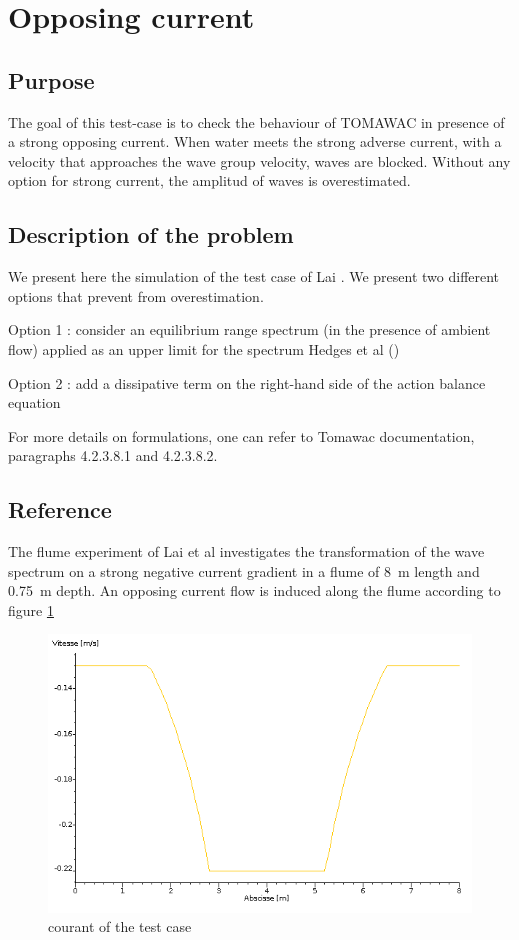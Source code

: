 \section{Opposing current}
%

%
\subsection{Purpose}
%
The goal of this test-case is to check the behaviour of TOMAWAC in presence of a strong opposing current. When water meets the strong adverse current, with a velocity that approaches the wave group velocity, waves are blocked. Without any option for strong current, the amplitud of waves is overestimated.

%
\subsection{Description of the problem}
%
We present here the simulation of the test case of Lai \cite{Lai1989}. We present two different options that prevent from overestimation.

Option 1 : consider an equilibrium range spectrum (in the presence of ambient flow) applied as an upper limit for the spectrum Hedges et al  (\cite{Hedges1985})

Option 2 : add a dissipative term on the right-hand side of the action balance equation \cite{Westhuys2012}

For more details on formulations, one can refer to Tomawac documentation, paragraphs 4.2.3.8.1 and 4.2.3.8.2.

%
\subsection{Reference}
%
The flume experiment of Lai et al \cite{Lai1989} investigates the transformation of the wave spectrum on a strong negative current gradient in a flume of 8~m length and 0.75~m depth. An opposing current flow is induced along the flume according to figure \ref{courant} 
\begin{figure} [!h]
\centering
\includegraphics[scale = 0.5]{courant.png}
 \caption{courant of the test case }
\label{courant}
\end{figure}

